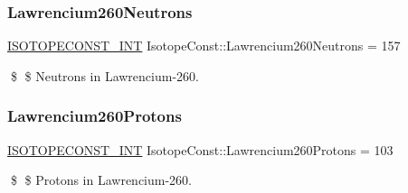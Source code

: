 \subsubsection{\texorpdfstring{Lawrencium260\+Neutrons}{Lawrencium260Neutrons}}
{\footnotesize\ttfamily \mbox{\hyperlink{group___isotope_const-_macros_ga5f18360b3e99483a35c32d789e62621c}{I\+S\+O\+T\+O\+P\+E\+C\+O\+N\+S\+T\+\_\+\+I\+NT}} Isotope\+Const\+::\+Lawrencium260\+Neutrons = 157}

\$ \$ Neutrons in Lawrencium-\/260. \mbox{\label{group___isotope_const-_lawrencium-_lr260_ga33b15a2951f3c505e53ce0dfd9f61d4f}} 
\subsubsection{\texorpdfstring{Lawrencium260\+Protons}{Lawrencium260Protons}}
{\footnotesize\ttfamily \mbox{\hyperlink{group___isotope_const-_macros_ga5f18360b3e99483a35c32d789e62621c}{I\+S\+O\+T\+O\+P\+E\+C\+O\+N\+S\+T\+\_\+\+I\+NT}} Isotope\+Const\+::\+Lawrencium260\+Protons = 103}

\$ \$ Protons in Lawrencium-\/260. 